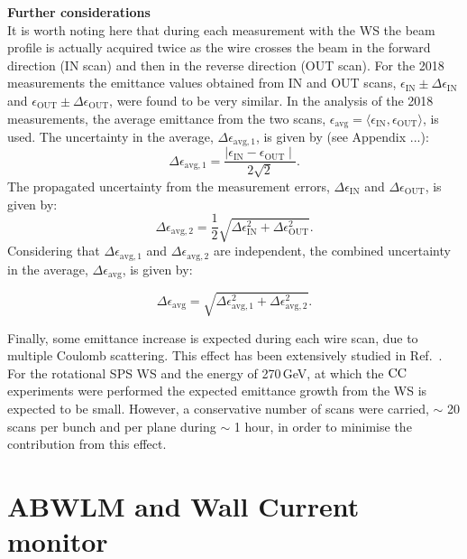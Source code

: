 \normalsize{\textbf{Further considerations}}\\
It is worth noting here that during each measurement with the WS the beam profile is actually acquired twice as the wire crosses the beam in the forward direction (IN scan) and then in the reverse direction (OUT scan). For the 2018 measurements the emittance values obtained from IN and OUT scans, $\epsilon_\mathrm{IN} \pm \Delta \epsilon_\mathrm{IN}$ and $\epsilon_\mathrm{OUT} \pm \Delta \epsilon_\mathrm{OUT}$, were found to be very similar. In the analysis of the 2018 measurements, the average emittance from the two scans, $\epsilon_\mathrm{avg} = \langle \epsilon_\mathrm{IN}, \epsilon_\mathrm{OUT}\rangle$, is used. The uncertainty in the average, $\Delta \epsilon_\mathrm{avg, 1}$, is given by (see Appendix ...): 
\begin{equation}\label{eq:uncertainty_mean_ws}
   \Delta \epsilon_\mathrm{avg, 1} = \frac{\mid \epsilon_\mathrm{IN} - \epsilon_\mathrm{OUT} \mid}{2 \sqrt{2}}.
\end{equation}
The propagated uncertainty from the measurement errors, $\Delta \epsilon_\mathrm{IN}$ and $\Delta \epsilon_\mathrm{OUT}$, is given by:
\begin{equation}\label{eq:propagated_uncertainty_ws}
   \Delta \epsilon_\mathrm{avg, 2} = \frac{1}{2}\sqrt{ \Delta \epsilon_\mathrm{IN}^2 + \Delta \epsilon_\mathrm{OUT}^2}.
\end{equation}
Considering that $\Delta \epsilon_\mathrm{avg, 1}$ and $\Delta \epsilon_\mathrm{avg, 2}$ are independent, the combined uncertainty in the average, $\Delta \epsilon_\mathrm{avg}$, is given by:

\begin{equation}\label{eq:combined_uncertainty_ws}
   \Delta \epsilon_\mathrm{avg} = \sqrt{\Delta \epsilon_\mathrm{avg, 1} ^2 + \Delta \epsilon_\mathrm{avg, 2} ^2}.
\end{equation}

Finally, some emittance increase is expected during each wire scan, due to multiple Coulomb scattering. This effect has been extensively studied in Ref.~\cite{Roncarolo:1481835}. For the rotational SPS WS and the energy of 270\,GeV, at which the ${\mathrm{CC}}$ experiments were performed the expected emittance growth from the WS is expected to be small. However, a conservative number of scans were carried, $\sim$ 20 scans per bunch and per plane during $\sim$ 1 hour, in order to minimise the contribution from this effect.

\section{ABWLM and Wall Current monitor}\label{sec:ABWLM_WallCurrentMonitor}

